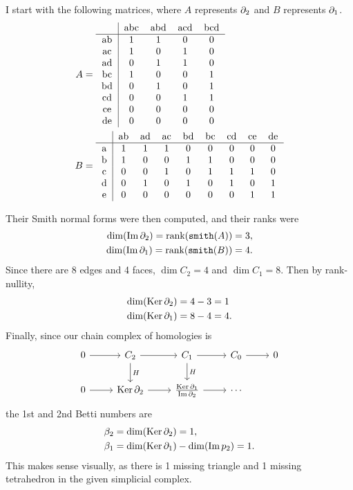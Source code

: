 \documentclass[twoside,10pt]{article}
\begin{document}
I start with the following matrices, where $A$ represents $\partial_2$ and $B$ represents $\partial_1$.
\begin{align*}
	A &=
	\begin{tabular}{c | c c c c}
		& abc & abd & acd & bcd \\
		\hline
		ab & 1 & 1 & 0 & 0 \\
		ac & 1 & 0 & 1 & 0 \\
		ad & 0 & 1 & 1 & 0 \\
		bc & 1 & 0 & 0 & 1 \\
		bd & 0 & 1 & 0 & 1 \\
		cd & 0 & 0 & 1 & 1 \\
		ce & 0 & 0 & 0 & 0 \\
		de & 0 & 0 & 0 & 0
	\end{tabular}
	\\
	B &=
	\begin{tabular}{c | c c c c c c c c}
		& ab & ad & ac & bd & bc & cd & ce & de \\
		\hline
		a & 1 & 1 & 1 & 0 & 0 & 0 & 0 & 0 \\
		b & 1 & 0 & 0 & 1 & 1 & 0 & 0 & 0 \\
		c & 0 & 0 & 1 & 0 & 1 & 1 & 1 & 0 \\
		d & 0 & 1 & 0 & 1 & 0 & 1 & 0 & 1 \\
		e & 0 & 0 & 0 & 0 & 0 & 0 & 1 & 1
	\end{tabular}
\end{align*}

Their Smith normal forms were then computed, and their ranks were
\begin{align*}
	\dim(\operatorname{Im} \partial_2) = \text{rank}(\texttt{smith}(A)) &= 3,\\
	\dim(\operatorname{Im} \partial_1) = \text{rank}(\texttt{smith}(B)) &= 4.
\end{align*}
Since there are 8 edges and 4 faces, $\dim C_2 = 4$ and $\dim C_1=8$. Then by rank-nullity,
\begin{align*}
	\dim(\operatorname{Ker} \partial_2) = 4-3 &= 1 \\
	\dim(\operatorname{Ker} \partial_1) = 8-4 &= 4.
\end{align*}
Finally, since our chain complex of homologies is
\[
\begin{tikzcd}
	0 \rar & C_2 \rar\dar{H} & C_1 \rar\dar{H} & C_0 \rar & 0 \\
	0 \rar & \ker \p_2 \rar & \frac{\ker \p_1}{\im \p_2} \rar & \cdots
\end{tikzcd}
\] 
the 1st and 2nd Betti numbers are
\begin{align*}
	\beta_2 &= \dim(\operatorname{Ker} \partial_2) = 1,\\
	\beta_1 &= \dim(\operatorname{Ker} \partial_1) - \dim(\operatorname{Im} p_2) = 1.
\end{align*}
This makes sense visually, as there is 1 missing triangle and 1 missing tetrahedron in the given simplicial complex.
\end{document}
